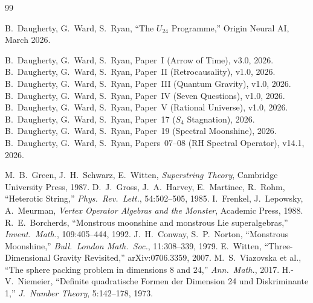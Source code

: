 \documentclass[12pt,a4paper]{article}
\theoremstyle{definition}\newtheorem{definition}[theorem]{Definition}
\theoremstyle{remark}\newtheorem{remark}[theorem]{Remark}
\begin{document}
\begin{thebibliography}{99}

 B.~Daugherty, G.~Ward, S.~Ryan, ``The $U_{24}$ Programme,''
  Origin Neural AI, March 2026.

 B.~Daugherty, G.~Ward, S.~Ryan, Paper~I (Arrow of Time), v3.0, 2026.
 B.~Daugherty, G.~Ward, S.~Ryan, Paper~II (Retrocausality), v1.0, 2026.
 B.~Daugherty, G.~Ward, S.~Ryan, Paper~III (Quantum Gravity), v1.0, 2026.
 B.~Daugherty, G.~Ward, S.~Ryan, Paper~IV (Seven Questions), v1.0, 2026.
 B.~Daugherty, G.~Ward, S.~Ryan, Paper~V (Rational Universe), v1.0, 2026.
 B.~Daugherty, G.~Ward, S.~Ryan, Paper~17 ($S_4$ Stagnation), 2026.
 B.~Daugherty, G.~Ward, S.~Ryan, Paper~19 (Spectral Moonshine), 2026.
 B.~Daugherty, G.~Ward, S.~Ryan, Papers~07--08 (RH Spectral Operator), v14.1, 2026.

 M.~B.~Green, J.~H.~Schwarz, E.~Witten, \emph{Superstring Theory},
  Cambridge University Press, 1987.
 D.~J.~Gross, J.~A.~Harvey, E.~Martinec, R.~Rohm,
  ``Heterotic String,'' \emph{Phys.\ Rev.\ Lett.}, 54:502--505, 1985.
 I.~Frenkel, J.~Lepowsky, A.~Meurman, \emph{Vertex Operator
  Algebras and the Monster}, Academic Press, 1988.
 R.~E.~Borcherds, ``Monstrous moonshine and monstrous
  Lie superalgebras,'' \emph{Invent.\ Math.}, 109:405--444, 1992.
 J.~H.~Conway, S.~P.~Norton, ``Monstrous Moonshine,''
  \emph{Bull.\ London Math.\ Soc.}, 11:308--339, 1979.
 E.~Witten, ``Three-Dimensional Gravity Revisited,''
  arXiv:0706.3359, 2007.
 M.~S.~Viazovska et al., ``The sphere packing problem
  in dimensions 8 and 24,'' \emph{Ann.\ Math.}, 2017.
 H.-V.~Niemeier, ``Definite quadratische Formen der
  Dimension 24 und Diskriminante 1,'' \emph{J.\ Number Theory}, 5:142--178, 1973.

\end{thebibliography}
\end{document}

